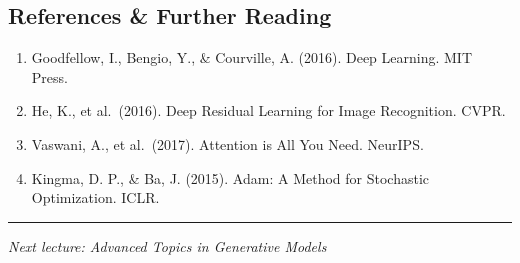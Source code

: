\documentclass[
  11pt,
  letterpaper,
]{article}
\providecommand{\tightlist}{%
  \setlength{\itemsep}{0pt}\setlength{\parskip}{0pt}}
\begin{document}
\subsection{References \& Further
Reading}\label{references-further-reading}

\begin{enumerate}
\def\labelenumi{\arabic{enumi}.}
\tightlist
\item
  Goodfellow, I., Bengio, Y., \& Courville, A. (2016). Deep Learning.
  MIT Press.
\item
  He, K., et al.~(2016). Deep Residual Learning for Image Recognition.
  CVPR.
\item
  Vaswani, A., et al.~(2017). Attention is All You Need. NeurIPS.
\item
  Kingma, D. P., \& Ba, J. (2015). Adam: A Method for Stochastic
  Optimization. ICLR.
\end{enumerate}

\begin{center}\rule{0.5\linewidth}{0.5pt}\end{center}

\emph{Next lecture: Advanced Topics in Generative Models}
\end{document}
